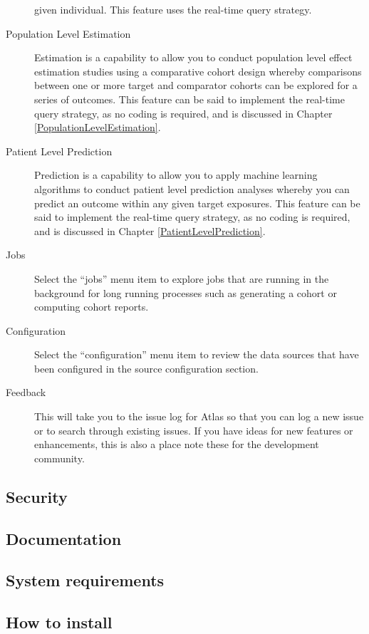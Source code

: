 \documentclass[11pt]{book}
\begin{document}
\begin{description}
given individual. This feature uses the real-time query strategy.
\item[Population Level Estimation]
Estimation is a capability to allow you to conduct population level
effect estimation studies using a comparative cohort design whereby
comparisons between one or more target and comparator cohorts can be
explored for a series of outcomes. This feature can be said to implement
the real-time query strategy, as no coding is required, and is discussed
in Chapter \ref{PopulationLevelEstimation}.
\item[Patient Level Prediction]
Prediction is a capability to allow you to apply machine learning
algorithms to conduct patient level prediction analyses whereby you can
predict an outcome within any given target exposures. This feature can
be said to implement the real-time query strategy, as no coding is
required, and is discussed in Chapter \ref{PatientLevelPrediction}.
\item[Jobs]
Select the ``jobs'' menu item to explore jobs that are running in the
background for long running processes such as generating a cohort or
computing cohort reports.
\item[Configuration]
Select the ``configuration'' menu item to review the data sources that
have been configured in the source configuration section.
\item[Feedback]
This will take you to the issue log for Atlas so that you can log a new
issue or to search through existing issues. If you have ideas for new
features or enhancements, this is also a place note these for the
development community.
\end{description}

\subsection{Security}\label{security}

\subsection{Documentation}\label{documentation}

\subsection{System requirements}\label{system-requirements}

\subsection{How to install}\label{how-to-install}
\end{document}
